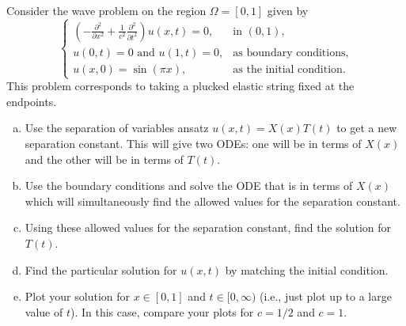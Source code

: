 \documentclass[12pt]{article} %
\begin{document}
\begin{problem}
    Consider the wave problem on the region $\Omega=[0,1]$ given by
    \[
    \begin{cases}
    \left( - \frac{\partial^2}{\partial x^2} +\frac{1}{c^2} \frac{\partial^2}{\partial t^2} \right) u(x,t) =0, & \textrm{in $(0,1)$},\\
    u(0,t)=0 \textrm{~and~} u(1,t)=0, &\textrm{as boundary conditions},\\
    u(x,0)=\sin(\pi x), &\textrm{as the initial condition}.
    \end{cases}
    \]
    This problem corresponds to taking a plucked elastic string fixed at the endpoints.
    \begin{enumerate}[(a)]
        \item Use the separation of variables ansatz $u(x,t)=X(x)T(t)$ to get a new separation constant. This will give two ODEs: one will be in terms of $X(x)$ and the other will be in terms of $T(t)$.
        \item Use the boundary conditions and solve the ODE that is in terms of $X(x)$ which will simultaneously find the allowed values for the separation constant.
        \item Using these allowed values for the separation constant, find the solution for $T(t)$.
        \item Find the particular solution for $u(x,t)$ by matching the initial condition.
        \item Plot your solution for $x\in [0,1]$ and $t\in [0,\infty)$ (i.e., just plot up to a large value of $t$). In this case, compare your plots for $c=1/2$ and $c=1$.
    \end{enumerate}
\end{problem}
\end{document}
